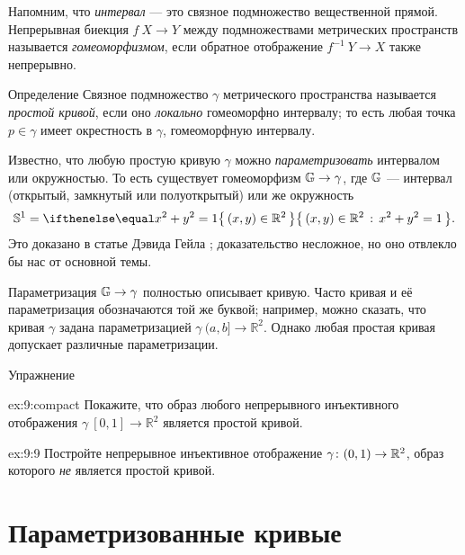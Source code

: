 Напомним, что \emph{интервал} --- это связное подмножество вещественной прямой.
Непрерывная биекция $f\:X\to Y$ между подмножествами метрических пространств называется {}\emph{гомеоморфизмом}, если обратное отображение $f^{-1}\:Y\to X$ также непрерывно.  

\begin{thm}{Определение} 
Связное подмножество $\gamma$ метрического пространства называется \emph{простой кривой}, если оно \emph{локально} гомеоморфно интервалу;
то есть любая точка $p\in \gamma$ имеет окрестность в $\gamma$, гомеоморфную интервалу.
\end{thm}

Известно, что любую простую кривую $\gamma$ можно \emph{параметризовать} интервалом или окружностью.
То есть существует гомеоморфизм $\mathbb{G}\to\gamma$, где $\mathbb{G}$ --- интервал (открытый, замкнутый или полуоткрытый) или же окружность
\[\mathbb{S}^1=\set{(x,y)\in\mathbb{R}^2}{x^2+y^2=1}.\] 
Это доказано в статье Дэвида Гейла \cite{gale};
доказательство несложное, но оно отвлекло бы нас от основной темы.

Параметризация $\mathbb{G}\to\gamma$ полностью описывает кривую.
Часто кривая и её параметризация обозначаются той же буквой;
например, можно сказать, что кривая $\gamma$ задана параметризацией $\gamma\:(a,b]\to \mathbb{R}^2$.
Однако любая простая кривая допускает различные параметризации.

\begin{thm}{Упражнение}\label{ex:9}
{\sloppy
\begin{subthm}{ex:9:compact}
Покажите, что образ любого непрерывного инъективного отображения $\gamma\:[0,1]\to\mathbb{R}^2$ является простой кривой.
\end{subthm}

}

\begin{subthm}{ex:9:9}
Постройте непрерывное инъективное отображение $\gamma\:(0,1)\z\to\mathbb{R}^2$, образ которого \textit{не} является простой кривой.
\end{subthm}

\end{thm}

\section{Параметризованные кривые}\label{sec:Parametrized curves}


